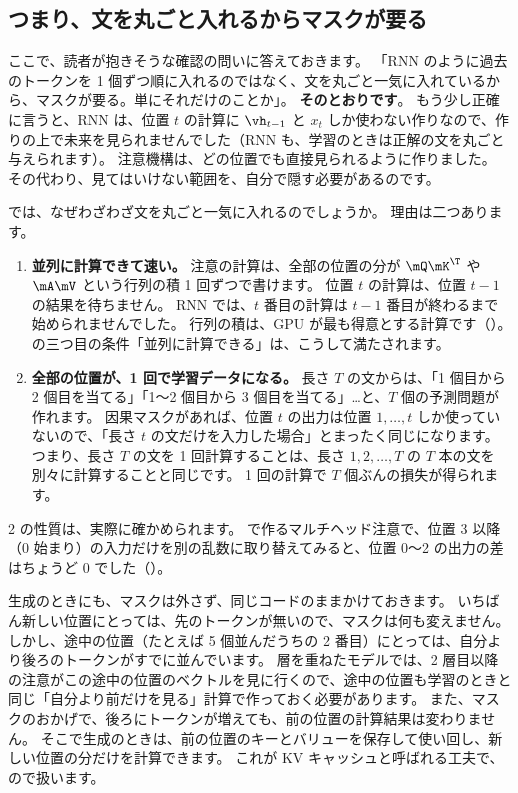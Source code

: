 \subsection*{つまり、文を丸ごと入れるからマスクが要る}

ここで、読者が抱きそうな確認の問いに答えておきます。
「RNN のように過去のトークンを 1 個ずつ順に入れるのではなく、文を丸ごと一気に入れているから、マスクが要る。単にそれだけのことか」。
\textbf{そのとおりです}。
もう少し正確に言うと、RNN は、位置 $t$ の計算に $\vh_{t-1}$ と $x_t$ しか使わない作りなので、作りの上で未来を見られませんでした（RNN も、学習のときは正解の文を丸ごと与えられます）。
注意機構は、どの位置でも直接見られるように作りました。
その代わり、見てはいけない範囲を、自分で隠す必要があるのです。

では、なぜわざわざ文を丸ごと一気に入れるのでしょうか。
理由は二つあります。
\begin{enumerate}
\item \textbf{並列に計算できて速い。}
注意の計算は、全部の位置の分が $\mQ\mK^\T$ や $\mA\mV$ という行列の積 1 回ずつで書けます。
位置 $t$ の計算は、位置 $t-1$ の結果を待ちません。
RNN では、$t$ 番目の計算は $t-1$ 番目が終わるまで始められませんでした。
行列の積は、GPU が最も得意とする計算です（）。
の三つ目の条件「並列に計算できる」は、こうして満たされます。
\item \textbf{全部の位置が、1 回で学習データになる。}
長さ $T$ の文からは、「1 個目から 2 個目を当てる」「1〜2 個目から 3 個目を当てる」\dots と、$T$ 個の予測問題が作れます。
因果マスクがあれば、位置 $t$ の出力は位置 $1,\dots,t$ しか使っていないので、「長さ $t$ の文だけを入力した場合」とまったく同じになります。
つまり、長さ $T$ の文を 1 回計算することは、長さ $1,2,\dots,T$ の $T$ 本の文を別々に計算することと同じです。
1 回の計算で $T$ 個ぶんの損失が得られます。
\end{enumerate}
2 の性質は、実際に確かめられます。
で作るマルチヘッド注意で、位置 3 以降（0 始まり）の入力だけを別の乱数に取り替えてみると、位置 0〜2 の出力の差はちょうど 0 でした（）。

生成のときにも、マスクは外さず、同じコードのままかけておきます。
いちばん新しい位置にとっては、先のトークンが無いので、マスクは何も変えません。
しかし、途中の位置（たとえば 5 個並んだうちの 2 番目）にとっては、自分より後ろのトークンがすでに並んでいます。
層を重ねたモデルでは、2 層目以降の注意がこの途中の位置のベクトルを見に行くので、途中の位置も学習のときと同じ「自分より前だけを見る」計算で作っておく必要があります。
また、マスクのおかげで、後ろにトークンが増えても、前の位置の計算結果は変わりません。
そこで生成のときは、前の位置のキーとバリューを保存して使い回し、新しい位置の分だけを計算できます。
これが KV キャッシュと呼ばれる工夫で、ので扱います。

